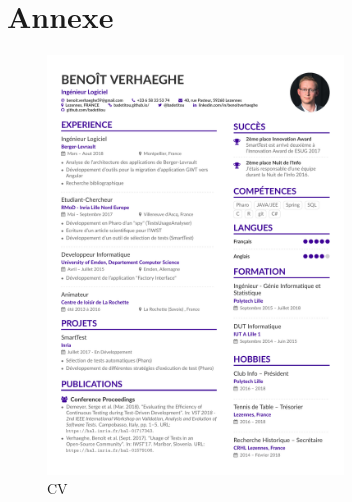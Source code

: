 \newpage

\hypertarget{annexe}{%
\section{Annexe}\label{annexe}}

\hypertarget{CV}{%
\begin{figure}
\centering
\includegraphics[width=0.7\textwidth,height=\textheight]{cv/cv.pdf}
\caption{CV}\label{CV}
\end{figure}
}
